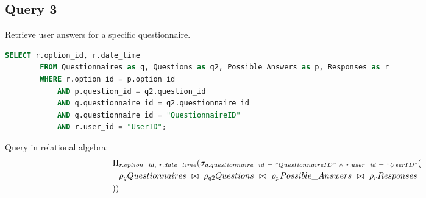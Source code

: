 \documentclass[12pt, oneside]{article}
\begin{document}
    \subsection*{Query 3}
    \noindent Retrieve user answers for a specific questionnaire.
    \begin{lstlisting}[language=SQL, columns=flexible, breaklines]
        SELECT r.option_id, r.date_time
        FROM Questionnaires as q, Questions as q2, Possible_Answers as p, Responses as r
        WHERE r.option_id = p.option_id 
            AND p.question_id = q2.question_id 
            AND q.questionnaire_id = q2.questionnaire_id
            AND q.questionnaire_id = "QuestionnaireID"
            AND r.user_id = "UserID";
    \end{lstlisting}
    \noindent Query in relational algebra: 
    \begin{align*}
        \Pi&_{r.option\_id,\ r.date\_time}(\sigma_{q.questionnaire\_id\ =\ "QuestionnaireID"\ \wedge\ r.user\_id\ =\ "UserID"}
        (\\
        &\rho_{q}Questionnaires\ \bowtie\ \rho_{q2}Questions\ \bowtie\ \rho_{p}Possible\_Answers\ \bowtie\ \rho_{r}Responses\\
        ))&
    \end{align*}
    
\end{document}
